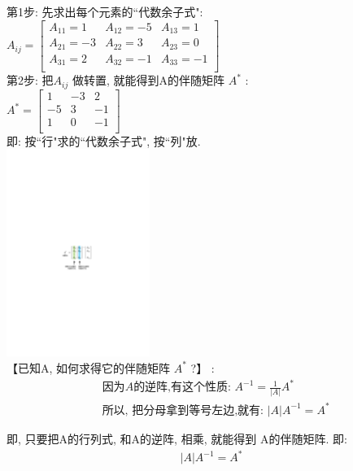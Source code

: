 \documentclass[UTF8]{ctexart}
\begin{document}
第1步: 先求出每个元素的``代数余子式": \\
$
A_{ij}=\left[ \begin{matrix}
	A_{11}=1&		A_{12}=-5&		A_{13}=1\\
	A_{21}=-3&		A_{22}=3&		A_{23}=0\\
	A_{31}=2&		A_{32}=-1&		A_{33}=-1\\
\end{matrix} \right]
$\\

第2步: 把$ A_{ij}$ 做转置, 就能得到A的伴随矩阵 $A^*$ :\\
$
A^*=\left[ \begin{array}{c|c|c}
	1&		-3&		2\\
	-5&		3&		-1\\
	1&		0&		-1\\
\end{array} \right]
$\\

即: 按``行"求的``代数余子式", 按``列"放. \\
\includegraphics[width=0.35\textwidth]{img/0025.pdf}\\


【已知A, 如何求得它的伴随矩阵 $A^*$ ?】 : 
\begin{align*}
	& \text{因为}A\text{的逆阵,有这个性质:\ }A^{-1}=\frac{1}{|A|}A^*\\
	& \text{所以,\ 把分母拿到等号左边,就有:\ |}A|A^{-1}=A^*
\end{align*}

即, 只要把A的行列式, 和A的逆阵, 相乘, 就能得到 A的伴随矩阵.
即:
\begin{align*}
	\boxed{
		|A|A^{-1}=A^*
	}
\end{align*}
\end{document}
